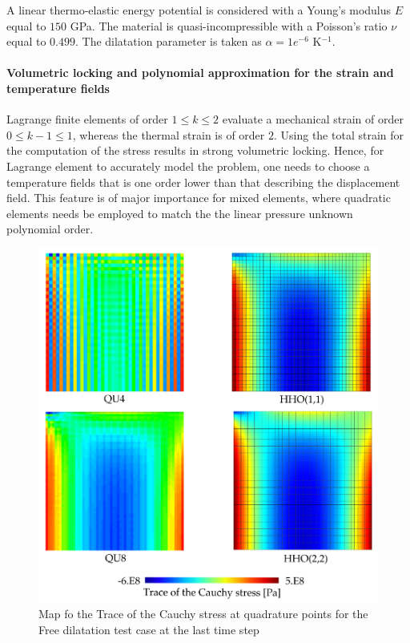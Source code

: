 A linear thermo-elastic energy potential is considered with a Young's
modulus $E$ equal to $150$ GPa. The material is quasi-incompressible
with a Poisson's ratio $\nu$ equal to $0.499$. The dilatation parameter
is taken as $\alpha = 1e^{-6}$ K$^{-1}$.

\paragraph{Volumetric locking and polynomial approximation for the strain and temperature fields}

Lagrange finite elements of order $1 \leq k \leq 2$ evaluate a
mechanical strain of order $0 \leq k-1 \leq 1$, whereas the thermal
strain is of order $2$. Using the total strain for the computation of
the stress results in strong volumetric locking. Hence, for Lagrange
element to accurately model the problem, one needs to choose a
temperature fields that is one order lower than that describing the
displacement field. This feature is of major importance for mixed
elements, where quadratic elements needs be employed to match the the
linear pressure unknown polynomial order.

\begin{figure}[H]
    \centering
    \includegraphics[width=10.cm]{img_calcs/satoh_calc.png}
    \caption{Map fo the Trace of the Cauchy stress at quadrature points for the Free dilatation test case at the last time step}
    \label{fig_satoh_calc}
\end{figure}

